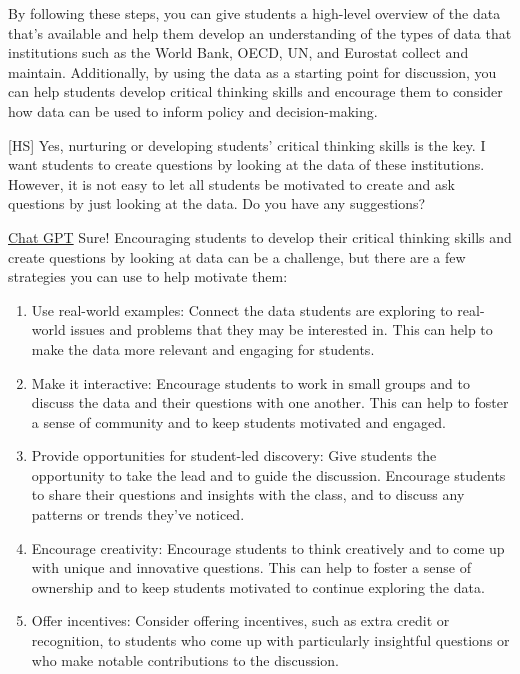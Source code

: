 \documentclass[
]{book}
\providecommand{\tightlist}{%
  \setlength{\itemsep}{0pt}\setlength{\parskip}{0pt}}
\theoremstyle{definition}
\theoremstyle{definition}
\theoremstyle{definition}
\theoremstyle{definition}
\theoremstyle{remark}
\begin{document}
By following these steps, you can give students a high-level overview of the data that's available and help them develop an understanding of the types of data that institutions such as the World Bank, OECD, UN, and Eurostat collect and maintain. Additionally, by using the data as a starting point for discussion, you can help students develop critical thinking skills and encourage them to consider how data can be used to inform policy and decision-making.

{[}HS{]} Yes, nurturing or developing students' critical thinking skills is the key. I want students to create questions by looking at the data of these institutions. However, it is not easy to let all students be motivated to create and ask questions by just looking at the data. Do you have any suggestions?

\protect\hyperlink{chatgpt}{Chat GPT} Sure! Encouraging students to develop their critical thinking skills and create questions by looking at data can be a challenge, but there are a few strategies you can use to help motivate them:

\begin{enumerate}
\def\labelenumi{\arabic{enumi}.}
\tightlist
\item
  Use real-world examples: Connect the data students are exploring to real-world issues and problems that they may be interested in. This can help to make the data more relevant and engaging for students.
\item
  Make it interactive: Encourage students to work in small groups and to discuss the data and their questions with one another. This can help to foster a sense of community and to keep students motivated and engaged.
\item
  Provide opportunities for student-led discovery: Give students the opportunity to take the lead and to guide the discussion. Encourage students to share their questions and insights with the class, and to discuss any patterns or trends they've noticed.
\item
  Encourage creativity: Encourage students to think creatively and to come up with unique and innovative questions. This can help to foster a sense of ownership and to keep students motivated to continue exploring the data.
\item
  Offer incentives: Consider offering incentives, such as extra credit or recognition, to students who come up with particularly insightful questions or who make notable contributions to the discussion.
\end{enumerate}
\end{document}
